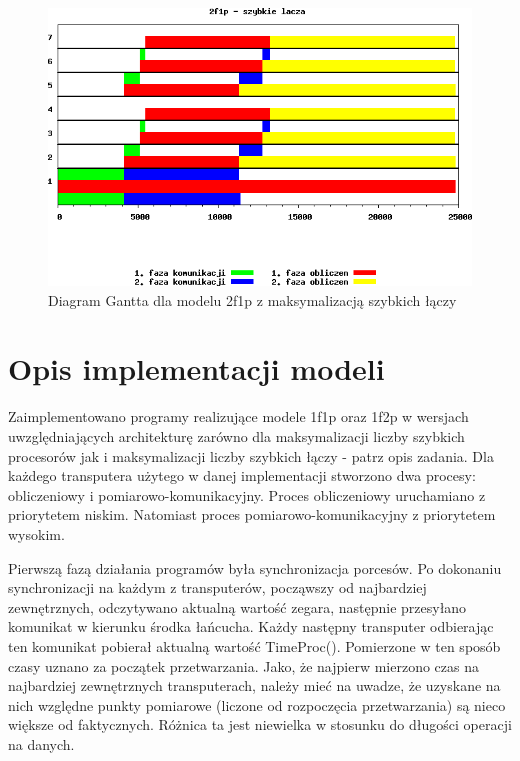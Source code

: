 \documentclass[a4paper,11pt, titlepage]{article}
\begin{document}
\begin{figure}[htp!]
\includegraphics[width=1.0\textwidth]{wykresy/1p2f_lacza}
\caption{Diagram Gantta dla modelu 2f1p z maksymalizacją szybkich łączy \label{1p2f_l}}
\end{figure}

\section{Opis implementacji modeli}
Zaimplementowano programy realizujące modele 1f1p oraz 1f2p w wersjach uwzględniających architekturę zarówno dla maksymalizacji liczby szybkich procesorów jak i maksymalizacji liczby szybkich łączy - patrz opis zadania. Dla każdego transputera użytego w danej implementacji stworzono dwa procesy: obliczeniowy i pomiarowo-komunikacyjny. Proces obliczeniowy uruchamiano z priorytetem niskim. Natomiast proces pomiarowo-komunikacyjny z priorytetem wysokim.

Pierwszą fazą działania programów była synchronizacja porcesów. Po dokonaniu synchronizacji na każdym z transputerów, począwszy od najbardziej zewnętrznych, odczytywano aktualną wartość zegara, następnie przesyłano komunikat w kierunku środka łańcucha. Każdy następny transputer odbierając ten komunikat pobierał aktualną wartość TimeProc(). Pomierzone w ten sposób czasy uznano za początek przetwarzania. Jako, że najpierw mierzono czas na najbardziej zewnętrznych transputerach, należy mieć na uwadze, że uzyskane na nich względne punkty pomiarowe (liczone od rozpoczęcia przetwarzania) są nieco większe od faktycznych. Różnica ta jest niewielka w stosunku do długości operacji na danych.
\end{document}
